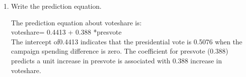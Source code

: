 \documentclass[12pt,letterpaper]{article}
\begin{document}
\begin{enumerate}
		\item Write the prediction equation.\\
		
		
		\vspace{.15cm}
		 
		\vspace{.15cm}
		\noindent The prediction equation about voteshare is:\\voteshare= 0.4413 + 0.388 *presvote\\
		
		The intercept of0.4413 indicates that the presidential vote is 0.5076 when the campaign spending difference is zero. 
		The coefficient for presvote (0.388) predicts a unit increase in presvote is associated with 0.388 increase in voteshare.
	\end{enumerate}
	

\vspace{.5cm}
\end{document}
